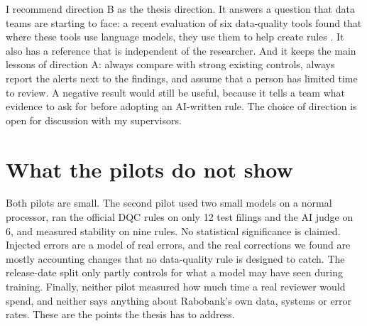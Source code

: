 \documentclass[11pt,a4paper]{article}
\begin{document}
I recommend direction B as the thesis direction. It answers a question that data teams are starting to face: a recent evaluation of six data-quality tools found that where these tools use language models, they use them to help create rules \cite{rehberger}. It also has a reference that is independent of the researcher. And it keeps the main lessons of direction A: always compare with strong existing controls, always report the alerts next to the findings, and assume that a person has limited time to review. A negative result would still be useful, because it tells a team what evidence to ask for before adopting an AI-written rule. The choice of direction is open for discussion with my supervisors.

\section{What the pilots do not show}

Both pilots are small. The second pilot used two small models on a normal processor, ran the official DQC rules on only 12 test filings and the AI judge on 6, and measured stability on nine rules. No statistical significance is claimed. Injected errors are a model of real errors, and the real corrections we found are mostly accounting changes that no data-quality rule is designed to catch. The release-date split only partly controls for what a model may have seen during training. Finally, neither pilot measured how much time a real reviewer would spend, and neither says anything about Rabobank's own data, systems or error rates. These are the points the thesis has to address.
\end{document}
